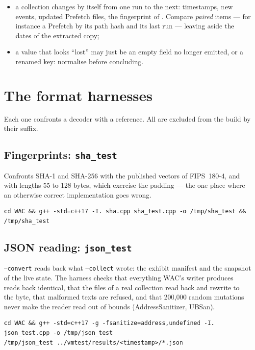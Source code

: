 \documentclass[11pt,a4paper,oneside]{report}
\begin{document}
\begin{itemize}
  \item a collection changes by itself from one run to the next: timestamps,
    new events, updated Prefetch files, the fingerprint of .
    Compare \emph{paired} items — for instance a Prefetch by its path hash and
    its last run — leaving aside the dates of the extracted copy;
  \item a value that looks ``lost'' may just be an empty field no longer emitted, or a
    renamed key: normalise before concluding.
\end{itemize}

\chapter{The format harnesses}\label{ch:format}

Each one confronts a \wac{} decoder with a reference. All are excluded from the
\wac{} build by their  suffix.

\section{Fingerprints: \texttt{sha\_test}}

Confronts SHA-1 and SHA-256 with the published vectors of FIPS~180-4, and with
lengths 55 to 128 bytes, which exercise the padding — the one place where an
otherwise correct implementation goes wrong.

\begin{lstlisting}
cd WAC && g++ -std=c++17 -I. sha.cpp sha_test.cpp -o /tmp/sha_test && /tmp/sha_test
\end{lstlisting}

\section{JSON reading: \texttt{json\_test}}

\texttt{--convert} reads back what \texttt{--collect} wrote: the exhibit
manifest and the snapshot of the live state. The harness checks that
everything WAC's writer produces reads back identical, that the files of a real
collection read back and rewrite to the byte, that malformed texts are refused,
and that 200,000 random mutations never make the reader read out of bounds
(AddressSanitizer, UBSan).

\begin{lstlisting}
cd WAC && g++ -std=c++17 -g -fsanitize=address,undefined -I. json_test.cpp -o /tmp/json_test
/tmp/json_test ../vmtest/results/<timestamp>/*.json
\end{lstlisting}
\end{document}
